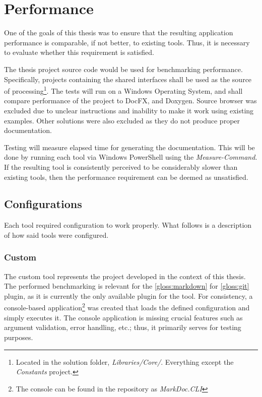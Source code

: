 \chapter{Performance}

One of the goals of this thesis was to ensure that the resulting application performance is comparable, if not better, to existing tools. Thus, it is necessary to evaluate whether this requirement is satisfied.

The thesis project source code would be used for benchmarking performance.
Specifically, projects containing the shared interfaces shall be used as the source of processing\footnote{Located in the solution folder, \textit{Libraries/Core/}. Everything except the \textit{Constants} project.}.
The tests will run on a Windows Operating System, and shall compare performance of the project to DocFX, and Doxygen. Source browser was excluded due to unclear instructions and inability to make it work using existing examples. Other solutions were also excluded as they do not produce proper documentation.

Testing will measure elapsed time for generating the documentation. This will be done by running each tool via Windows PowerShell using the \textit{Measure-Command}. If the resulting tool is consistently perceived to be considerably slower than existing tools, then the performance requirement can be deemed as unsatisfied.

\section{Configurations}

Each tool required configuration to work properly. What follows is a description of how said tools were configured.

\subsection{Custom}

The custom tool represents the project developed in the context of this thesis.
The performed benchmarking is relevant for the \ref{gloss:markdown} for \ref{gloss:git} plugin, as it is currently the only available plugin for the tool.
For consistency, a console-based application\footnote{The console can be found in the repository as \textit{MarkDoc.CLI}} was created that loads the defined configuration and simply executes it.
The console application is missing crucial features such as argument validation, error handling, etc.; thus, it primarily serves for testing purposes.

